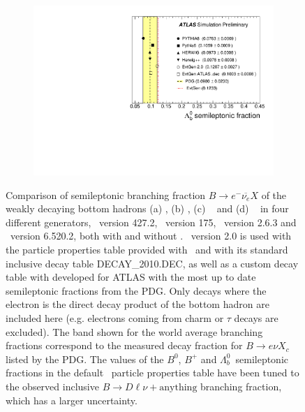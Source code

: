 \begin{figure}
\begin{subfigure}[]{0.45\textwidth}
\end{subfigure}
\begin{subfigure}[]{0.45\textwidth}
\includegraphics[width=\textwidth]{evtgen/figures/EvtGen/h_Lambdab_sl.pdf}
\end{subfigure}
\caption{Comparison of semileptonic branching fraction $B\rightarrow e^-\overline{\nu_e} X$ 
of the weakly decaying bottom hadrons 
(a) \Bo, (b) \Bp, (c) \Bs~ and (d) \Lb~
in four different generators,
\Pythia\ version 427.2, \PythiaE\ version 175, \Herwigpp\  version 2.6.3 and \Herwig\ version 6.520.2, 
both with and without
\EvtGen.  
\EvtGen\ version 2.0 is used with the particle properties table provided with \EvtGen\ and with 
its standard inclusive decay table DECAY\_2010.DEC, as well as a custom decay table with developed for ATLAS with the most up to date semileptonic fractions from the PDG.
Only decays where the electron is the direct decay product of the bottom hadron are included here (e.g.
electrons coming from charm or $\tau $ decays are excluded).
The band shown for the world average branching fractions correspond to the
measured decay fraction for $B\rightarrow e\nu X_c$ listed by the PDG\cite{PhysRevD.86.010001}.
The values of the $B^0$, $B^+$ and $\Lambda^0_b$~semileptonic fractions in the 
default \EvtGen\ particle properties table have been tuned to the
observed inclusive $B\rightarrow D\ell\nu+\mathrm{anything}$ branching fraction, which has a 
larger uncertainty.}
\label{fig:bsl}
\end{figure}

